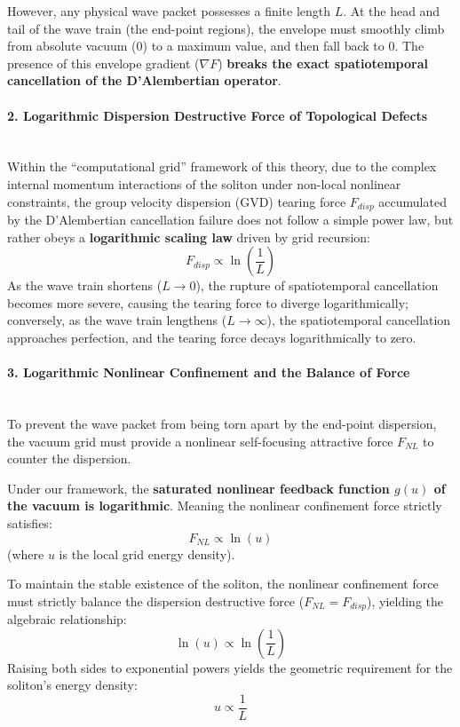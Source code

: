 \documentclass[12pt, a4paper]{article}
\begin{document}
However, any physical wave packet possesses a finite length $L$. At the head and tail of the wave train (the end-point regions), the envelope must smoothly climb from absolute vacuum ($0$) to a maximum value, and then fall back to $0$. The presence of this envelope gradient ($\nabla F$) \textbf{breaks the exact spatiotemporal cancellation of the D'Alembertian operator}.

\paragraph{2. Logarithmic Dispersion Destructive Force of Topological Defects} ~\\
Within the ``computational grid'' framework of this theory, due to the complex internal momentum interactions of the soliton under non-local nonlinear constraints, the group velocity dispersion (GVD) tearing force $F_{disp}$ accumulated by the D'Alembertian cancellation failure does not follow a simple power law, but rather obeys a \textbf{logarithmic scaling law} driven by grid recursion:
\begin{equation}
    F_{disp} \propto \ln\left(\frac{1}{L}\right)
\end{equation}
As the wave train shortens ($L \to 0$), the rupture of spatiotemporal cancellation becomes more severe, causing the tearing force to diverge logarithmically; conversely, as the wave train lengthens ($L \to \infty$), the spatiotemporal cancellation approaches perfection, and the tearing force decays logarithmically to zero.

\paragraph{3. Logarithmic Nonlinear Confinement and the Balance of Force} ~\\
To prevent the wave packet from being torn apart by the end-point dispersion, the vacuum grid must provide a nonlinear self-focusing attractive force $F_{NL}$ to counter the dispersion. 

Under our framework, the \textbf{saturated nonlinear feedback function $g(u)$ of the vacuum is logarithmic}. Meaning the nonlinear confinement force strictly satisfies:
\begin{equation}
    F_{NL} \propto \ln(u)
\end{equation}
(where $u$ is the local grid energy density).

To maintain the stable existence of the soliton, the nonlinear confinement force must strictly balance the dispersion destructive force ($F_{NL} = F_{disp}$), yielding the algebraic relationship:
\begin{equation}
    \ln(u) \propto \ln\left(\frac{1}{L}\right)
\end{equation}
Raising both sides to exponential powers yields the geometric requirement for the soliton's energy density:
\begin{equation}
    u \propto \frac{1}{L}
\end{equation}
\end{document}
